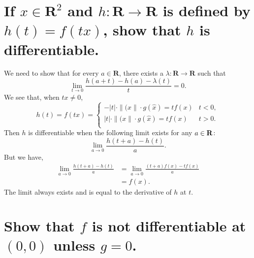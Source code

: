 \begin{parts}
    \part{
        If $x\in \mathbf{R}^2$ and
        $h:\mathbf{R}\to\mathbf{R}
        $ is defined by $h(t)=f(tx)$, show that
        $h$ is differentiable.
    }

    \begin{solution}
        We need to show that for every $a\in
        \mathbf{R}$, there
        exists a $\lambda:\mathbf{R}\to\mathbf{R}$
        such that
        \begin{equation}
            \lim_{t\to 0}
            {\frac{h(a+t)-h(a)-\lambda(t)}{t}} = 0.
        \end{equation}
        We see that, when $tx\neq 0$,
        $$h(t)=f(tx)=
        \begin{cases}
            -\vert t\vert\cdot\|(x\|\cdot 
            g\left(\hat{x}\right) = tf(x) & t<0,\\
            \vert t\vert\cdot\|(x\|\cdot 
            g\left(\hat{x}\right) = tf(x) & t>0.\\
        \end{cases}$$
        Then $h$ is differentiable when the
        following
        limit exists for any $a\in \mathbf{R}$:
        $$\lim_{a \to 0 }{\frac{h(t+a)-h(t)}{a}}.$$
        But we have,
        \begin{align*}
            \lim_{a\to 0}{\frac{h(t+a)-h(t)}{a}}
            &=\lim_{a\to 0}{\frac{(t+a)f(x)-tf(x)}
            {a}}\\
            &= f(x).
        \end{align*}
        The limit always exists and is equal to the
        derivative of $h$ at $t$.
    \end{solution}

    \part{
        Show that $f$ is not differentiable at
        $(0,0)$
        unless $g=0$.
    }
    \begin{solution}
        
    \end{solution}
\end{parts}